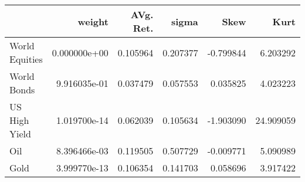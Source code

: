 \begin{tabular}{lrrrrr}
\toprule
{} &        weight &  AVg. Ret. &     sigma &      Skew &       Kurt \\
\midrule
World Equities &  0.000000e+00 &   0.105964 &  0.207377 & -0.799844 &   6.203292 \\
World Bonds    &  9.916035e-01 &   0.037479 &  0.057553 &  0.035825 &   4.023223 \\
US High Yield  &  1.019700e-14 &   0.062039 &  0.105634 & -1.903090 &  24.909059 \\
Oil            &  8.396466e-03 &   0.119505 &  0.507729 & -0.009771 &   5.090989 \\
Gold           &  3.999770e-13 &   0.106354 &  0.141703 &  0.058696 &   3.917422 \\
\bottomrule
\end{tabular}
